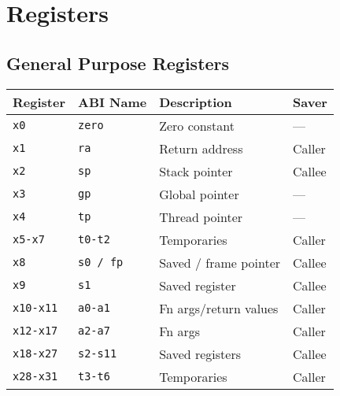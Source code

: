 \section*{Registers}

\subsection*{General Purpose Registers}

\begin{tabular} {l | l | l | l} \hline
Register     & ABI Name     & Description           & Saver  \\ \hline
\tt{x0}      & \tt{zero}    & Zero constant         & ---    \\
\tt{x1}      & \tt{ra}      & Return address        & Caller \\
\tt{x2}      & \tt{sp}      & Stack pointer         & Callee \\
\tt{x3}      & \tt{gp}      & Global pointer        & ---    \\
\tt{x4}      & \tt{tp}      & Thread pointer        & ---    \\
\tt{x5-x7}   & \tt{t0-t2}   & Temporaries           & Caller \\
\tt{x8}      & \tt{s0 / fp} & Saved / frame pointer & Callee \\
\tt{x9}      & \tt{s1}      & Saved register        & Callee \\
\tt{x10-x11} & \tt{a0-a1}   & Fn args/return values & Caller \\
\tt{x12-x17} & \tt{a2-a7}   & Fn args               & Caller \\
\tt{x18-x27} & \tt{s2-s11}  & Saved registers       & Callee \\
\tt{x28-x31} & \tt{t3-t6}   & Temporaries           & Caller \\ \hline
\end{tabular}


